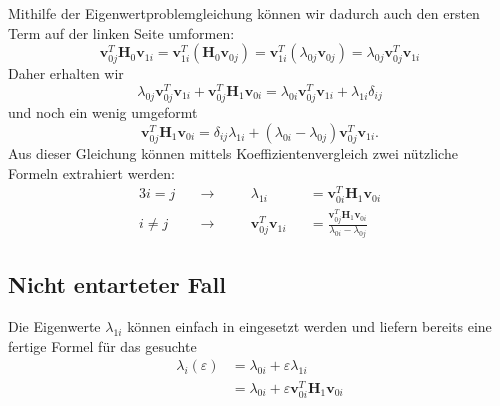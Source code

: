 Mithilfe der Eigenwertproblemgleichung können wir dadurch auch den ersten Term auf der linken Seite umformen:
\begin{equation}
    \bm v_{0j}^T \bm H_0 \bm v_{1i}
    =
    \bm v_{1i}^T \left(\bm H_0  \bm v_{0j} \right)
    =
    \bm v_{1i}^T \left(\lambda_{0j}  \bm v_{0j} \right)
    =
    \lambda_{0j} \bm v_{0j}^T \bm v_{1i}
\end{equation}
Daher erhalten wir
\begin{equation}
    \lambda_{0j} \bm v_{0j}^T \bm v_{1i} +
    \bm v_{0j}^T \bm H_1 \bm v_{0i}
    =
    \lambda_{0i} \bm v_{0j}^T \bm v_{1i} +
    \lambda_{1i} \delta_{ij}
\end{equation}
und noch ein wenig umgeformt
\begin{equation}
    \bm v_{0j}^T \bm H_1 \bm v_{0i}
    =
    \delta_{ij} \lambda_{1i} +
    ( \lambda_{0i} - \lambda_{0j} )
    \bm v_{0j}^T  \bm v_{1i} .
\end{equation} \label{ew:eq:f}
Aus dieser Gleichung können mittels Koeffizientenvergleich zwei nützliche Formeln extrahiert werden:
\begin{alignat}{3}
    i = j \quad & \rightarrow  \quad && \lambda_{1i}&& = \bm v_{0i}^T \bm H_1 \bm v_{0i} \\
    i \neq j \quad & \rightarrow \quad && \bm v_{0j}^T \bm v_{1i}&& = \frac{\bm v_{0j}^T \bm H_1 \bm v_{0i}}{\lambda_{0i} - \lambda_{0j}}  \label{ew:eq:f2}
\end{alignat}

\subsection{Nicht entarteter Fall}

Die Eigenwerte $\lambda_{1i}$ können einfach in  eingesetzt werden und liefern bereits eine fertige Formel für das gesuchte
\begin{align*}
    \lambda_i(\varepsilon)
    &=
    \lambda_{0i} + \varepsilon \lambda_{1i} \\
    &=
    \lambda_{0i} + \varepsilon \bm v_{0i}^T \bm H_1 \bm v_{0i}
\end{align*}

